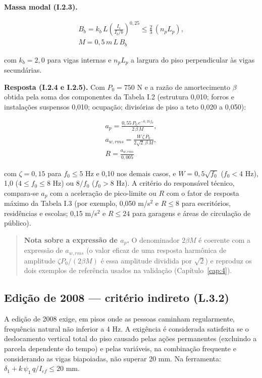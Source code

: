 \textbf{Massa modal (I.2.3).}

\begin{gather*}
  B_b = k_b\, L \left(\frac{I_s}{I_b/b}\right)^{0{,}25} \le \frac{2}{3}\,(n_p L_p), \\
  M = 0{,}5\, m\, L\, B_b
\end{gather*}

com $k_b = 2{,}0$ para vigas internas e $n_p L_p$ a largura do piso perpendicular às vigas secundárias.

\textbf{Resposta (I.2.4 e I.2.5).} Com $P_0 = 750$ N e a razão de amortecimento $\beta$ obtida pela soma dos componentes da Tabela I.2 (estrutura 0,010; forros e instalações suspensos 0,010; ocupação; divisórias de piso a teto 0,020 a 0,050):

\begin{gather*}
  a_p = \frac{0{,}55\, P_0\, e^{-0{,}35 f_0}}{2\,\beta\, M}, \\
  a_{w,rms} = \frac{W\,\zeta\, P_0}{2\sqrt{2}\,\beta\, M}, \\
  R = \frac{a_{w,rms}}{0{,}005}
\end{gather*}

com $\zeta = 0{,}15$ para $f_0 \le 5$ Hz e 0,10 nos demais casos, e $W = 0{,}5\sqrt{f_0}$ ($f_0 < 4$ Hz), 1,0 ($4 \le f_0 \le 8$ Hz) ou $8/f_0$ ($f_0 > 8$ Hz). A critério do responsável técnico, compara-se $a_p$ com a aceleração de pico-limite ou $R$ com o fator de resposta máximo da Tabela I.3 (por exemplo, 0,050 m/s\ensuremath{^2} e $R \le 8$ para escritórios, residências e escolas; 0,15 m/s\ensuremath{^2} e $R \le 24$ para garagens e áreas de circulação de público).

\begin{quote}\small
\textbf{Nota sobre a expressão de $a_p$.} O denominador $2\beta M$ é coerente com a expressão de $a_{w,rms}$ (o valor eficaz de uma resposta harmônica de amplitude $\zeta P_0/(2\beta M)$ é essa amplitude dividida por $\sqrt{2}$) e reproduz os dois exemplos de referência usados na validação (Capítulo~\ref{cap:4}). 
\end{quote}

\subsection{Edição de 2008 --- critério indireto (L.3.2)}\label{sec:2.9.2}
A edição de 2008 exige, em pisos onde as pessoas caminham regularmente, frequência natural não inferior a 4 Hz. A exigência é considerada satisfeita se o deslocamento vertical total do piso causado pelas ações permanentes (excluindo a parcela dependente do tempo) e pelas variáveis, na combinação frequente e considerando as vigas biapoiadas, não superar 20 mm. Na ferramenta: $\delta_1 + k\,\psi_1\, q / I_{ef} \le 20$ mm.

